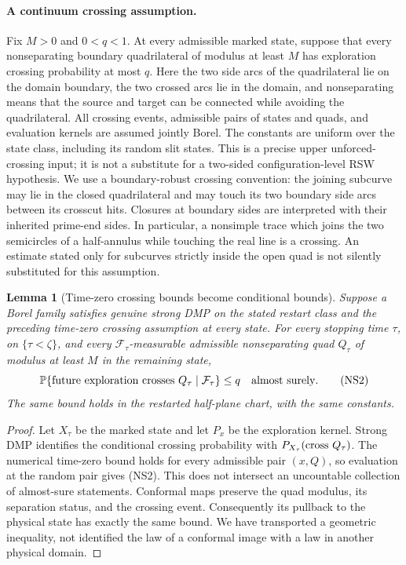 \documentclass[11pt]{article}
\newtheorem{lemma}[theorem]{Lemma}
\theoremstyle{definition}\newtheorem{definition}[theorem]{Definition}
\theoremstyle{remark}\newtheorem{remark}[theorem]{Remark}
\begin{document}
\paragraph{A continuum crossing assumption.}
Fix $M>0$ and $0<q<1$. At every admissible marked state, suppose that
every nonseparating boundary quadrilateral of modulus at least $M$
has exploration crossing probability at most $q$. Here the two side
arcs of the quadrilateral lie on the domain boundary, the two crossed
arcs lie in the domain, and nonseparating means that the source and
target can be connected while avoiding the quadrilateral. All crossing
events, admissible pairs of states and quads, and evaluation kernels
are assumed jointly Borel. The constants are uniform over the state
class, including its random slit states. This is a precise upper
unforced-crossing input; it is not a substitute for a two-sided
configuration-level RSW hypothesis. We use a boundary-robust
crossing convention: the joining subcurve may lie in the closed
quadrilateral and may touch its two boundary side arcs between its
crosscut hits. Closures at boundary sides are interpreted with their
inherited prime-end sides. In particular, a nonsimple trace which
joins the two semicircles of a half-annulus while touching the real
line is a crossing. An estimate stated only for subcurves strictly
inside the open quad is not silently substituted for this assumption.

\begin{lemma}[Time-zero crossing bounds become conditional bounds]
\label{lem:ns-timezero-conditional}
Suppose a Borel family satisfies genuine strong DMP on the stated
restart class and the preceding time-zero crossing assumption at every
state. For every stopping time $\tau$, on $\{\tau<\zeta\}$, and every
$\mathcal F_\tau$-measurable admissible nonseparating quad $Q_\tau$
of modulus at least $M$ in the remaining state,
\[
 \mathbb P\{\hbox{future exploration crosses }Q_\tau
                   \mid\mathcal F_\tau\}\le q
       \quad\hbox{almost surely}.
 \tag{NS2}
\]
The same bound holds in the restarted half-plane chart, with the same
constants.
\end{lemma}
\begin{proof}
Let $X_\tau$ be the marked state and let $P_x$ be the exploration
kernel. Strong DMP identifies the conditional crossing probability
with $P_{X_\tau}(\hbox{cross }Q_\tau)$. The numerical time-zero
bound holds for every admissible pair $(x,Q)$, so evaluation at the
random pair gives (NS2). This does not intersect an uncountable
collection of almost-sure statements. Conformal maps preserve the
quad modulus, its separation status, and the crossing event.
Consequently its pullback to the physical state has exactly the same
bound. We have transported a geometric inequality, not identified the
law of a conformal image with a law in another physical domain.
\end{proof}
\end{document}
